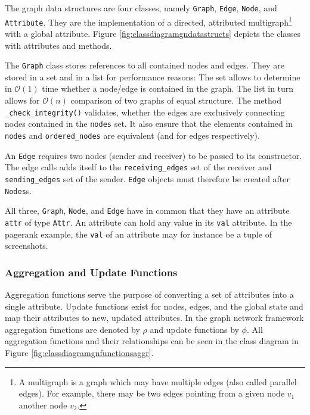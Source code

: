 The graph data structures are four classes, namely \texttt{Graph}, \texttt{Edge}, \texttt{Node}, and \texttt{Attribute}. They are the implementation of a directed, attributed multigraph\footnote{A multigraph is a graph which may have multiple edges (also called parallel edges). For example, there may be two edges pointing from a given node $v_1$ another node $v_2$.} with a global attribute. Figure \ref{fig:classdiagramgndatastructs} depicts the classes with attributes and methods.

The \texttt{Graph} class stores references to all contained nodes and edges. They are stored in a set and in a list for performance reasons: The set allows to determine in $\mathcal{O}(1)$ time whether a node/edge is contained in the graph. The list in turn allows for $\mathcal{O}(n)$ comparison of two graphs of equal structure. The method \texttt{\_check\_integrity()} validates, whether the edges are exclusively connecting nodes contained in the \texttt{nodes} set. It also ensure that the elements contained in \texttt{nodes} and \texttt{ordered\_nodes} are equivalent (and for edges respectively).

An \texttt{Edge} requires two nodes (sender and receiver) to be passed to its constructor. The edge calls adds itself to the \texttt{receiving\_edges} set of the receiver and \texttt{sending\_edges} set of the sender. \texttt{Edge} objects must therefore be created after \texttt{Nodes}s.

All three, \texttt{Graph}, \texttt{Node}, and \texttt{Edge} have in common that they have an attribute \texttt{attr} of type \texttt{Attr}. An attribute can hold any value in its \texttt{val} attribute. In the pagerank example, the \texttt{val} of an attribute may for instance be a tuple of screenshots.

\subsubsection{Aggregation and Update Functions}

Aggregation functions serve the purpose of converting a set of attributes into a single attribute. Update functions exist for nodes, edges, and the global state and map their attributes to new, updated attributes. In the graph network framework aggregation functions are denoted by $\rho$ and update functions by $\phi$. All aggregation functions and their relationships can be seen in the class diagram in Figure \ref{fig:classdiagramgnfunctionsaggr}.


